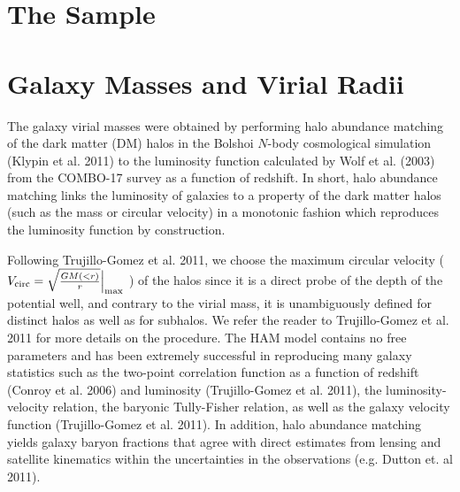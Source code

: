 \documentclass{emulateapj}
\begin{document}


\section{The Sample}


\section{Galaxy Masses and Virial Radii}

The galaxy virial masses were obtained by performing halo abundance
matching
\citep[HAM,][]{kravtsov04,tasitsiomi04,vale04,conroy06,conroy09,guo10,behroozi10,firmani10,trujillo-gomez11,rodriguez-puebla12}
of the dark matter (DM) halos in the Bolshoi $N$-body cosmological
simulation (Klypin et al.  2011) to the luminosity function calculated
by Wolf et al. (2003) from the COMBO-17 survey as a function of
redshift. In short, halo abundance matching links the luminosity of
galaxies to a property of the dark matter halos (such as the mass or
circular velocity) in a monotonic fashion which reproduces the
luminosity function by construction.

Following Trujillo-Gomez et al. 2011, we choose the
maximum circular velocity ( $V_{\rm circ} =
\sqrt{\frac{GM(<r)}{r}}\Big|_{\rm max}$ ) of the halos since it is a
direct probe of the depth of the potential well, and contrary to the
virial mass, it is unambiguously defined for distinct halos as well as
for subhalos. We refer the reader to Trujillo-Gomez et al. 2011 for
more details on the procedure. The HAM model contains no free
parameters and has been extremely successful in reproducing many
galaxy statistics such as the two-point correlation function as a
function of redshift (Conroy et al. 2006) and luminosity
(Trujillo-Gomez et al. 2011), the luminosity-velocity relation, the
baryonic Tully-Fisher relation, as well as the galaxy velocity
function (Trujillo-Gomez et al. 2011). In addition, halo abundance
matching yields galaxy baryon fractions that agree with direct
estimates from lensing and satellite kinematics within the
uncertainties in the observations (e.g. Dutton et. al 2011).
\end{document}

